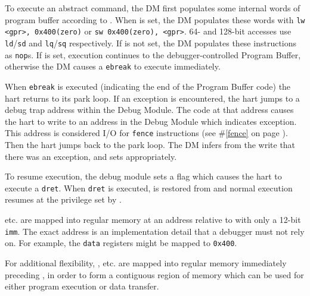 To execute an abstract command, the DM first populates some internal words of
program buffer according to \RdmCommand. When \FacAccessregisterTransfer is set, the DM
populates these words with {\tt lw <gpr>, 0x400(zero)} or {\tt sw 0x400(zero), <gpr>}.
64- and 128-bit accesses use {\tt ld}/{\tt sd} and {\tt lq}/{\tt sq}
respectively. If \FacAccessregisterTransfer is not set, the DM populates these instructions as {\tt nop}s.
If \FcsrMcontrolExecute is set, execution continues to the debugger-controlled Program Buffer,
otherwise the DM causes a {\tt ebreak} to execute immediately.

When {\tt ebreak} is executed (indicating the end of the
Program Buffer code) the hart returns to its park loop. If an exception is
encountered, the hart jumps to a debug trap address within
the Debug Module. The code at that address causes the hart to
write to an address in the Debug Module which indicates exception.
This address is considered I/O for {\tt fence} instructions (see \#\ref{fence}
on page \pageref{fence}).
Then the hart jumps back to the park loop.
The DM infers from the write that there was an exception, and sets \FdmAbstractcsCmderr appropriately.

To resume execution, the debug module sets a flag which causes the hart to execute a {\tt dret}.
When {\tt dret} is executed, \Rpc is restored from \RcsrDpc and normal execution resumes at the
privilege set by \FcsrDcsrPrv.

\RdmDataZero etc. are mapped into regular memory at an address relative to \Rzero
with only a 12-bit {\tt imm}. The exact address is an implementation
detail that a debugger must not rely on. For example, the {\tt data}
registers might be mapped to {\tt 0x400}.

For additional flexibility, \RdmProgbufZero, etc. are mapped into regular memory
immediately preceding \RdmDataZero, in order to form a contiguous region of memory which
can be used for either program execution or data transfer.
